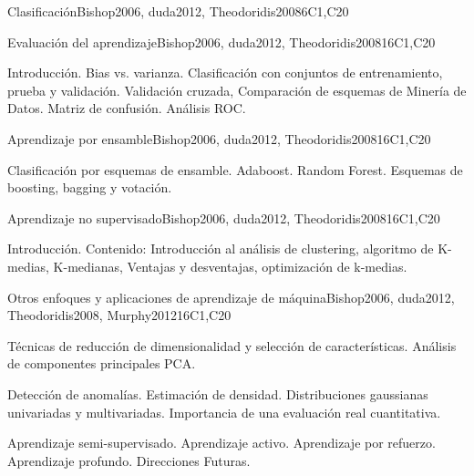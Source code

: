 \begin{syllabus}
\begin{unit}{Clasificación}{}{Bishop2006, duda2012, Theodoridis2008}{6}{C1,C20}
\begin{topics}
\end{topics}

\end{unit}

\begin{unit}{Evaluación del aprendizaje}{}{Bishop2006, duda2012, Theodoridis2008}{16}{C1,C20}
\begin{topics}
      \item Introducción. Bias vs. varianza. Clasificación con conjuntos de entrenamiento, prueba y validación. Validación cruzada, Comparación de esquemas de Minería de Datos. Matriz de confusión. Análisis ROC.
   \end{topics}

\end{unit}

\begin{unit}{Aprendizaje por ensamble}{}{Bishop2006, duda2012, Theodoridis2008}{16}{C1,C20}
\begin{topics}
      \item Clasificación por esquemas de ensamble. Adaboost. Random Forest. Esquemas de boosting, bagging y votación.
   \end{topics}

\end{unit}

\begin{unit}{Aprendizaje no supervisado}{}{Bishop2006, duda2012, Theodoridis2008}{16}{C1,C20}
\begin{topics}
      \item Introducción. Contenido: Introducción al análisis de clustering, algoritmo de K-medias, K-medianas, Ventajas y desventajas, optimización de k-medias.
   \end{topics}

\end{unit}

\begin{unit}{Otros enfoques y aplicaciones de aprendizaje de máquina}{}{Bishop2006, duda2012, Theodoridis2008, Murphy2012}{16}{C1,C20}
\begin{topics}
      \item Técnicas de reducción de dimensionalidad y selección de características. Análisis de componentes principales PCA.
      \item Detección de anomalías. Estimación de densidad. Distribuciones gaussianas univariadas y multivariadas. Importancia de una evaluación real cuantitativa.
      \item Aprendizaje semi-supervisado. Aprendizaje activo. Aprendizaje por refuerzo. Aprendizaje profundo. Direcciones Futuras.
   \end{topics}
\end{unit}

\begin{coursebibliography}
\end{coursebibliography}

\end{syllabus}